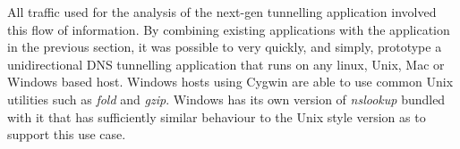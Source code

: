 \documentclass[12pt]{report}
\theoremstyle{remark}
\theoremstyle{definition}
\theoremstyle{definition}
\theoremstyle{definition}
\begin{document}
\begin{appendices}
All traffic used for the analysis of the next-gen tunnelling application
involved this flow of information. By combining existing applications with the
application in the previous section, it was possible to very quickly, and
simply, prototype a unidirectional DNS tunnelling application that runs on any
linux, Unix, Mac or Windows based host. Windows hosts using Cygwin are able to use
common Unix utilities such as \emph{fold} and \emph{gzip}. Windows has its own version of
\emph{nslookup} bundled with it that has sufficiently similar behaviour to the Unix
style version as to support this use case.

\end{appendices}

\newpage


%
%
\end{document}
